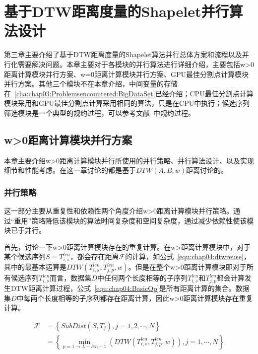 \chapter{基于DTW距离度量的Shapelet并行算法设计}
\label{cha:chap04:myalg}


第三章主要介绍了基于DTW距离度量的Shapelet算法并行总体方案和流程以及并行化需要解决问题。本章主要对于各模块的并行算法进行详细介绍，主要包括w>0距离计算模块并行方案、w=0距离计算模块并行方案、GPU最佳分割点计算模块并行方案。其他三个模块不在本章介绍，中间变量的存储在~\ref{cha:chap03:Problemsencountered:BigDataSet}已经介绍；CPU最佳分割点计算模块采用和GPU最佳分割点计算采用相同的算法，只是在CPU中执行；候选序列筛选模块是一个典型的规约过程，可以参考文献~\cite{harris2007optimizing}中规约过程。

\section{w>0距离计算模块并行方案}
\label{cha:chap04:myalg:DTW}
本章主要介绍w>0距离计算模块并行所使用的并行策略、并行算法设计、以及实现细节和性能考虑。在这一章讨论的都是基于$DTW(A,B,w)$距离讨论的。

\subsection{并行策略}

这一部分主要从重复性和依赖性两个角度介绍w>0距离计算模块并行策略。通过“重用”策略降低该模块的算法时间复杂度和空间复杂度，通过减少依赖性使该模块已于并行。

首先，讨论一下w>0距离计算模块存在的重复计算。在w>距离计算模块中，对于某个候选序列$S = T_{i,s}^{len}$，都会存在距离$\mathcal{F}$的计算，如公式~\ref{equ:chap04:dtwreuse}，其中的最基本运算是$DTW(T_{i,s}^{len},T_{j,p}^{len},w)$。但是在整个w>0距离计算模块即对于所有候选序列$T_{i,s}^{len}$而言，数据集$D$中任何两个长度相等的子序列$T_{i,s}^{len}$和$T_{j,p}^{len}$都会计算发生DTW距离计算过程，公式~\ref{equ:chap04:BasicOp}是所有距离计算的集合。数据集$D$中每两个长度相等的子序列都存在距离计算，因此w>0距离计算模块存在重复计算。

\begin{equation}
\label{equ:chap04:dtwreuse}
\begin{split}
\mathcal{F} &=\left\lbrace SubDist(S,T_j),j=1,2,\cdots,N\right\rbrace \\ 
&=\left\lbrace \min_{p=1\to L-len+1}(DTW(T_{i,s}^{len},T_{j,p}^{len},w)),j=1,\cdots,N\right\rbrace
\end{split}
\end{equation}

